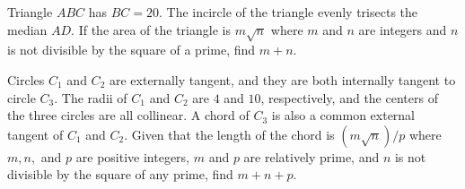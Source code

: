 \documentclass[11pt]{article}
\theoremstyle{definition}
\begin{document}
%	













\begin{question}[name={2005 AIME I, \href{https://artofproblemsolving.com/community/c4p365372}{Problem 15}}]
	Triangle $ABC$ has $BC=20$. The incircle of the triangle evenly trisects the median $AD$. If the area of the triangle is $m \sqrt{n}$ where $m$ and $n$ are integers and $n$ is not divisible by the square of a prime, find $m+n$.	
\end{question}


%	













\begin{question}[name={2005 AIME II, \href{https://artofproblemsolving.com/community/c4p368269}{Problem 8}}]
	Circles $C_1$ and $C_2$ are externally tangent, and they are both internally tangent to circle $C_3$. The radii of $C_1$ and $C_2$ are $4$ and $10$, respectively, and the centers of the three circles are all collinear. A chord of $C_3$ is also a common external tangent of $C_1$ and $C_2$. Given that the length of the chord is $({m\sqrt{n}})/{p}$ where $m,n,$ and $p$ are positive integers, $m$ and $p$ are relatively prime, and $n$ is not divisible by the square of any prime, find $m+n+p$.
\end{question}


%	
\end{document}
